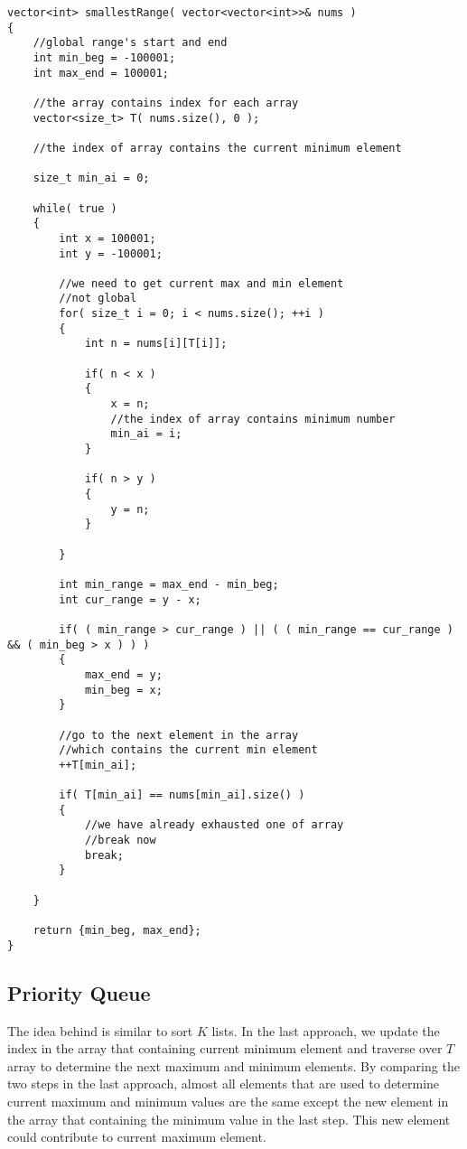 \begin{lstlisting}[style=customc, caption={Index Array}]
vector<int> smallestRange( vector<vector<int>>& nums )
{
    //global range's start and end
    int min_beg = -100001;
    int max_end = 100001;

    //the array contains index for each array
    vector<size_t> T( nums.size(), 0 );

    //the index of array contains the current minimum element

    size_t min_ai = 0;

    while( true )
    {
        int x = 100001;
        int y = -100001;

        //we need to get current max and min element
        //not global
        for( size_t i = 0; i < nums.size(); ++i )
        {
            int n = nums[i][T[i]];

            if( n < x )
            {
                x = n;
                //the index of array contains minimum number
                min_ai = i;
            }

            if( n > y )
            {
                y = n;
            }

        }

        int min_range = max_end - min_beg;
        int cur_range = y - x;

        if( ( min_range > cur_range ) || ( ( min_range == cur_range ) && ( min_beg > x ) ) )
        {
            max_end = y;
            min_beg = x;
        }

        //go to the next element in the array
        //which contains the current min element
        ++T[min_ai];

        if( T[min_ai] == nums[min_ai].size() )
        {
            //we have already exhausted one of array
            //break now
            break;
        }

    }

    return {min_beg, max_end};
}
\end{lstlisting}
  
\subsection{Priority Queue}
The idea behind is similar to sort $K$ lists. In the last approach, we update the index in the array that containing current minimum element and traverse over $T$ array to determine the next maximum and minimum elements. By comparing the two steps in the last approach, almost all elements that are used to determine current maximum and minimum values are the same except the new element in the array that containing the minimum value in the last step. This new element could contribute to current maximum element. 

